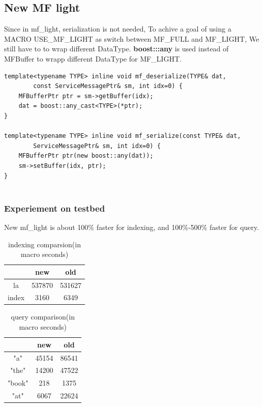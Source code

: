 \documentclass[a4paper,10pt]{article}
\begin{document}
\subsection{New MF light}

   Since in mf\_light, serialization is not needed,
   To achive a goal of using a MACRO USE\_MF\_LIGHT as switch between MF\_FULL and MF\_LIGHT,
   We still have to to wrap different DataType.  
   \textbf{boost:::any} is used instead of MFBuffer to wrapp different DataType for MF\_LIGHT.

\begin{lstlisting}
template<typename TYPE> inline void mf_deserialize(TYPE& dat,
		const ServiceMessagePtr& sm, int idx=0) {
	MFBufferPtr ptr = sm->getBuffer(idx);
	dat = boost::any_cast<TYPE>(*ptr);
}

template<typename TYPE> inline void mf_serialize(const TYPE& dat,
		ServiceMessagePtr& sm, int idx=0) {	
	MFBufferPtr ptr(new boost::any(dat));
	sm->setBuffer(idx, ptr);
}
 
\end{lstlisting}



\subsubsection{Experiement on testbed}
New mf\_light is about  100\% faster for indexing, and 100\%-500\% faster for query.


\begin{table} \label{table:1}
\centering
\caption{indexing comparsion(in macro seconds)}
\begin{tabular}{|c|c|c|} \hline
       & new & old \\  \hline
 la    & 537870 & 531627 \\  \hline
 index & 3160 & 6349 \\  \hline
\hline
\end{tabular}
\end{table}


\begin{table} \label{table:1}
\centering
\caption{query comparison(in macro seconds)}
\begin{tabular}{|c|c|c|} \hline
       &   new    &  old   \\  \hline
 "a"   &   45154  &  86541 \\  \hline
"the"  &   14200  &  47522 \\  \hline
"book" &   218    &  1375  \\  \hline
"at"   &   6067   &  22624 \\  \hline
\hline
\end{tabular}
\end{table}
\end{document}
